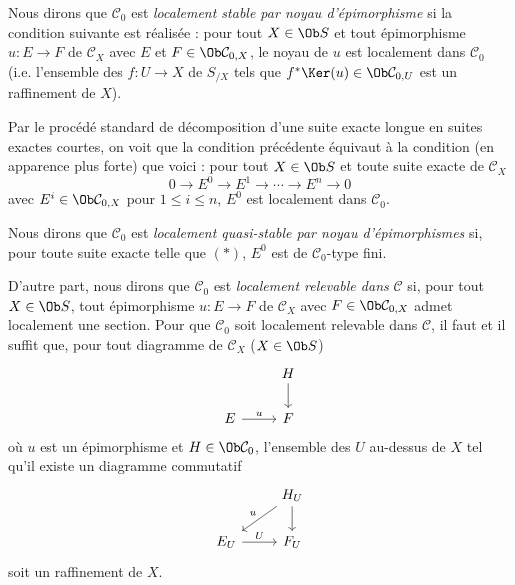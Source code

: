Nous dirons que \(\mathcal C_0\) est \emph{localement stable par noyau d'épimorphisme} si la condition suivante est réalisée : pour tout \(X\in\Ob S\) et tout épimorphisme \(u:E\longrightarrow F\) de \(\mathcal C_X\) avec \(E\) et \(F\in\Ob\mathcal C_{0,X}\), le noyau de \(u\) est localement dans \(\mathcal C_0\) (i.e. l'ensemble des \(f:U\to X\) de \(S_{/X}\) tels que \(f^*\Ker(u)\in\Ob\mathcal C_{0,U}\) est un raffinement de \(X\)).

Par le procédé standard de décomposition d'une suite exacte longue en suites exactes courtes, on voit que la condition précédente équivaut à la condition (en apparence plus forte) que voici : pour tout \(X\in\Ob S\) et toute suite exacte de \(\mathcal C_X\)
\begin{equation}\tag{*}
  0\longrightarrow E^0\longrightarrow E^1\longrightarrow\cdots\longrightarrow E^n\longrightarrow 0
\end{equation}
avec \(E^i\in\Ob\mathcal C_{0,X}\) pour \(1\leq i\leq n\), \(E^0\) est localement dans \(\mathcal C_0\).

Nous dirons que \(\mathcal C_0\) est \emph{localement quasi-stable par noyau d'épimorphismes} si, pour toute suite exacte telle que \((*)\), \(E^0\) est de \(\mathcal C_0\)-type fini.

D'autre part, nous dirons que \(\mathcal C_0\) est \emph{localement relevable dans} \(\mathcal C\) si, pour tout \(X\in\Ob S\), tout épimorphisme \(u:E\longrightarrow F\) de \(\mathcal C_X\) avec \(F\in\Ob\mathcal C_{0,X}\) admet localement une section. Pour que \(\mathcal C_0\) soit localement relevable dans \(\mathcal C\), il faut et il suffit que, pour tout diagramme de \(\mathcal C_X\) (\(X\in\Ob S\))
\[
\begin{tikzcd}
& H \arrow[d]\\
E \arrow[r,"u"] & F
\end{tikzcd}
\]
où \(u\) est un épimorphisme et \(H\in\Ob\mathcal C_0\), l'ensemble des \(U\) au-dessus de \(X\) tel qu'il existe un diagramme commutatif
\[
\begin{tikzcd}
& H_U \arrow[d] \arrow[dl,"u"']\\
E_U \arrow[r,"U"] & F_U
\end{tikzcd}
\]
soit un raffinement de \(X\).

